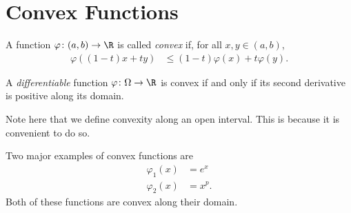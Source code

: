 \documentclass[12pt]{mypackage}
\begin{document}
\section{Convex Functions}%
\begin{definition}
  A function $\varphi\colon (a,b) \rightarrow \R$ is called \textit{convex} if, for all $x,y\in (a,b)$,
  \begin{align*}
    \varphi\left( \left( 1-t \right)x + ty\right) &\leq \left( 1-t \right)\varphi\left( x \right) + t\varphi\left( y \right).
  \end{align*}
\end{definition}
\begin{remark}
A \textit{differentiable} function $\varphi\colon \Omega \rightarrow \R$ is convex if and only if its second derivative is positive along its domain.\newline

Note here that we define convexity along an open interval. This is because it is convenient to do so.
\end{remark}
Two major examples of convex functions are
\begin{align*}
  \varphi_1(x) &= e^{x}\\
  \varphi_2(x) &= x^{p}.\tag*{$1\leq p < \infty$}
\end{align*}
Both of these functions are convex along their domain.\newline
\end{document}
